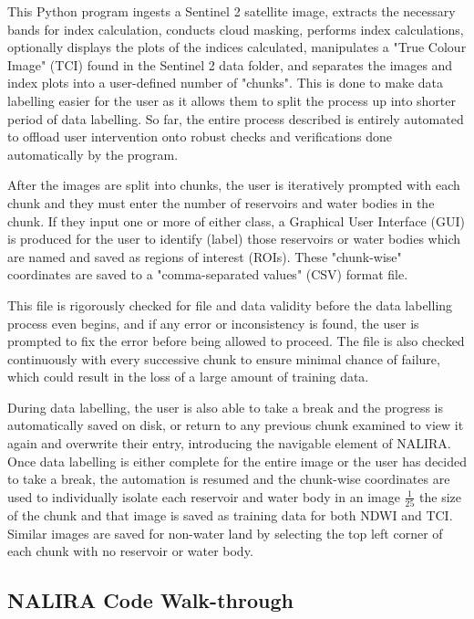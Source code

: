 This Python program ingests a Sentinel 2 satellite image, extracts the necessary bands for index calculation, conducts cloud masking, performs index calculations, optionally displays the plots of the indices calculated, manipulates a "True Colour Image" (TCI) found in the Sentinel 2 data folder, and separates the images and index plots into a user-defined number of "chunks". This is done to make data labelling easier for the user as it allows them to split the process up into shorter period of data labelling. So far, the entire process described is entirely automated to offload user intervention onto robust checks and verifications done automatically by the program. 

After the images are split into chunks, the user is iteratively prompted with each chunk and they must enter the number of reservoirs and water bodies in the chunk. If they input one or more of either class, a Graphical User Interface (GUI) is produced for the user to identify (label) those reservoirs or water bodies which are named and saved as regions of interest (ROIs). These "chunk-wise" coordinates are saved to a "comma-separated values" (CSV) format file. 

This file is rigorously checked for file and data validity before the data labelling process even begins, and if any error or inconsistency is found, the user is prompted to fix the error before being allowed to proceed. The file is also checked continuously with every successive chunk to ensure minimal chance of failure, which could result in the loss of a large amount of training data. 

During data labelling, the user is also able to take a break and the progress is automatically saved on disk, or return to any previous chunk examined to view it again and overwrite their entry, introducing the navigable element of NALIRA. Once data labelling is either complete for the entire image or the user has decided to take a break, the automation is resumed and the chunk-wise coordinates are used to individually isolate each reservoir and water body in an image $\frac{1}{25}$ the size of the chunk and that image is saved as training data for both NDWI and TCI. Similar images are saved for non-water land by selecting the top left corner of each chunk with no reservoir or water body. 

\subsection{NALIRA Code Walk-through}


